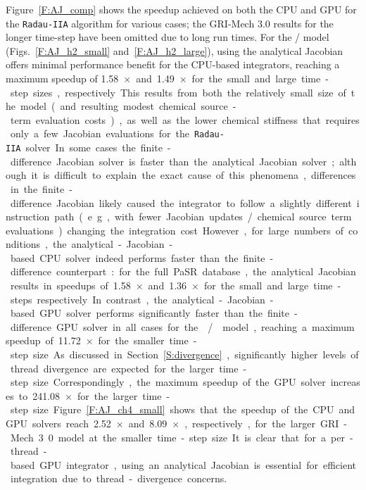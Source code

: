 \documentclass[preprint,review,11pt]{elsarticle}
\begin{document}
Figure~\ref{F:AJ_comp} shows the speedup achieved on both the CPU and GPU for the \texttt{Radau-IIA} algorithm for various cases; the GRI-Mech 3.0 results for the longer time-step have been omitted due to long run times.
For the \slash{} model (Figs.~\ref{F:AJ_h2_small} and~\ref{F:AJ_h2_large}), using the analytical Jacobian offers minimal performance benefit for the CPU-based integrators, reaching a maximum speedup of \SI{1.58}{$\times$} and \SI{1.49}{$\times$} for the small and large time-step sizes, respectively.
This results from both the relatively small size of the model (and resulting modest chemical source-term evaluation costs), as well as the lower chemical stiffness that requires only a few Jacobian evaluations for the \texttt{Radau-IIA} solver.
In some cases the finite-difference Jacobian solver is faster than the analytical Jacobian solver; although it is difficult to explain the exact cause of this phenomena, differences in the finite-difference Jacobian likely caused the integrator to follow a slightly different instruction path (e.g., with fewer Jacobian updates\slash chemical source term evaluations) changing the integration cost.
However, for large numbers of conditions, the analytical-Jacobian-based CPU solver indeed performs faster than the finite-difference counterpart: for the full PaSR database, the analytical Jacobian results in speedups of \SI{1.58}{$\times$} and \SI{1.36}{$\times$} for the small and large time-steps respectively.
In contrast, the analytical-Jacobian-based GPU solver performs significantly faster than the finite-difference GPU solver in all cases for the \slash{} model, reaching a maximum speedup of \SI{11.72}{$\times$} for the smaller time-step size.
As discussed in Section~\ref{S:divergence}, significantly higher levels of thread divergence are expected for the larger time-step size.
Correspondingly, the maximum speedup of the GPU solver increases to \SI{241.08}{$\times$} for the larger time-step size.
Figure~\ref{F:AJ_ch4_small} shows that the speedup of the CPU and GPU solvers reach \SI{2.52}{$\times$} and \SI{8.09}{$\times$}, respectively, for the larger GRI-Mech 3.0 model at the smaller time-step size.
It is clear that for a per-thread-based GPU integrator, using an analytical Jacobian is essential for efficient integration due to thread-divergence concerns.
\end{document}
